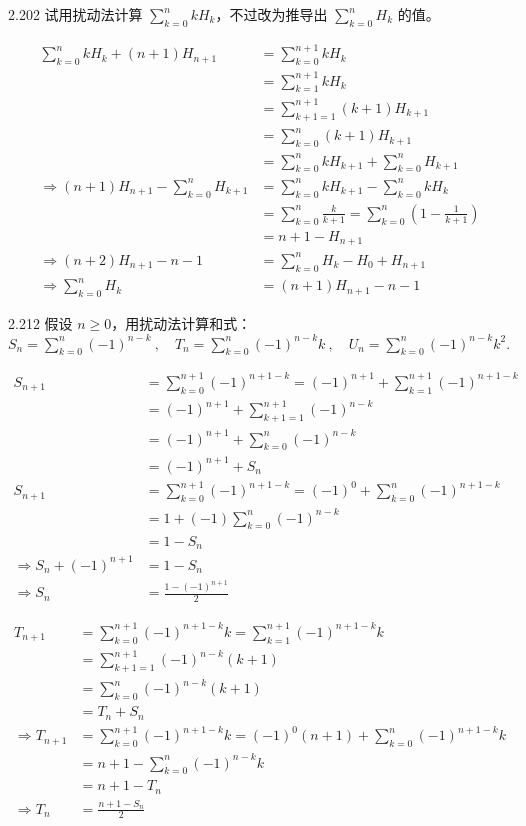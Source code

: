 \begin{problem}{2.20}{2}
  试用扰动法计算 \( \sum_{k=0}^n k H_k \)，不过改为推导出 \( \sum_{k=0}^n H_k \) 的值。
\end{problem}

\begin{align*}
  \sum_{k=0}^n k H_k + (n + 1) H_{n+1} &= \sum_{k=0}^{n+1} k H_k \\
  &= \sum_{k=1}^{n+1} k H_k \\
  &= \sum_{k+1=1}^{n+1} (k + 1) H_{k+1} \\
  &= \sum_{k=0}^n (k + 1) H_{k+1} \\
  &= \sum_{k=0}^n k H_{k+1} + \sum_{k=0}^n H_{k+1} \\
  \Rightarrow (n + 1) H_{n+1} - \sum_{k=0}^n H_{k+1} &= \sum_{k=0}^n k H_{k+1} - \sum_{k=0}^n k H_k \\
  &= \sum_{k=0}^n \frac{k}{k+1} = \sum_{k=0}^n (1 - \frac{1}{k+1}) \\
  &= n + 1 - H_{n+1} \\
  \Rightarrow (n + 2) H_{n+1} - n - 1 &= \sum_{k=0}^n H_k - H_0 + H_{n+1} \\
  \Rightarrow \sum_{k=0}^n H_k &= (n + 1) H_{n+1} - n - 1
\end{align*}

\begin{problem}{2.21}{2}
  假设 \( n \ge 0 \)，用扰动法计算和式：\( S_n = \sum_{k=0}^n (-1)^{n-k} \ , \quad T_n = \sum_{k=0}^n (-1)^{n-k} k \ , \quad U_n = \sum_{k=0}^n (-1)^{n-k} k^2 \).
\end{problem}

\begin{align*}
  S_{n+1} &= \sum_{k=0}^{n+1} (-1)^{n + 1 - k} = (-1)^{n+1} + \sum_{k=1}^{n+1} (-1)^{n + 1 - k} \\
  &= (-1)^{n+1} + \sum_{k+1=1}^{n+1} (-1)^{n-k} \\
  &= (-1)^{n+1} + \sum_{k=0}^n (-1)^{n-k} \\
  &= (-1)^{n+1} + S_n \\
  S_{n+1} &= \sum_{k=0}^{n+1} (-1)^{n+1-k} = (-1)^0 + \sum_{k=0}^n (-1)^{n+1-k} \\
  &= 1 + (-1) \sum_{k=0}^n (-1)^{n-k} \\
  &= 1 - S_n \\
  \Rightarrow S_n + (-1)^{n+1} &= 1 - S_n \\
  \Rightarrow S_n &= \frac{1 - (-1)^{n+1}}{2}
\end{align*}

\begin{align*}
  T_{n+1} &= \sum_{k=0}^{n+1} (-1)^{n+1-k} k = \sum_{k=1}^{n+1} (-1)^{n+1-k} k \\
  &= \sum_{k+1=1}^{n+1} (-1)^{n-k} (k + 1) \\
  &= \sum_{k=0}^n (-1)^{n-k} (k + 1) \\
  &= T_n + S_n \\
  \Rightarrow T_{n+1} &= \sum_{k=0}^{n+1} (-1)^{n+1-k} k = (-1)^0 (n + 1) + \sum_{k=0}^n (-1)^{n+1-k} k \\
  &= n + 1 - \sum_{k=0}^n (-1)^{n-k} k \\
  &= n + 1 - T_n \\
  \Rightarrow T_n &= \frac{n + 1 - S_n}{2}
\end{align*}

